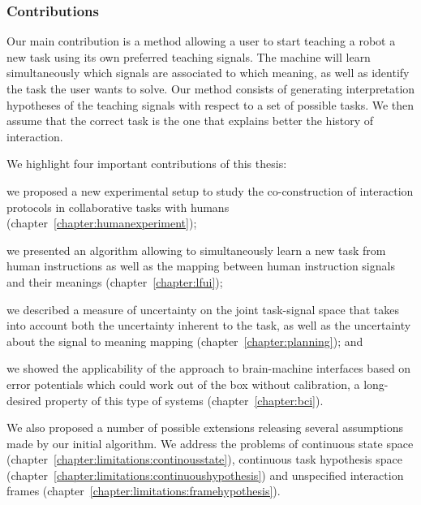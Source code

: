 \subsubsection*{Contributions}

Our main contribution is a method allowing a user to start teaching a robot a new task using its own preferred teaching signals. The machine will learn simultaneously which signals are associated to which meaning, as well as identify the task the user wants to solve. Our method consists of generating interpretation hypotheses of the teaching signals with respect to a set of possible tasks. We then assume that the correct task is the one that explains better the history of interaction.

We highlight four important contributions of this thesis: \begin{inparaenum}[(1)] \item we proposed a new experimental setup to study the co-construction of interaction protocols in collaborative tasks with humans (chapter~\ref{chapter:humanexperiment}); \item we presented an algorithm allowing to simultaneously learn a new task from human instructions as well as the mapping between human instruction signals and their meanings (chapter~\ref{chapter:lfui}); \item we described a measure of uncertainty on the joint task-signal space that takes into account both the uncertainty inherent to the task, as well as the uncertainty about the signal to meaning mapping (chapter~\ref{chapter:planning}); and \item we showed the applicability of the approach to brain-machine interfaces based on error potentials which could work out of the box without calibration, a long-desired property of this type of systems (chapter~\ref{chapter:bci}). \end{inparaenum}

We also proposed a number of possible extensions releasing several assumptions made by our initial algorithm. We address the problems of continuous state space (chapter~\ref{chapter:limitations:continousstate}), continuous task hypothesis space (chapter~\ref{chapter:limitations:continuoushypothesis}) and unspecified interaction frames (chapter~\ref{chapter:limitations:framehypothesis}). 


